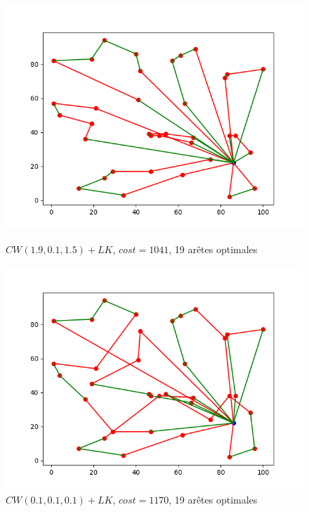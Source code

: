 \documentclass[a4paper,11pt]{article}%
\begin{document}
\begin{figure}
    \begin{minipage}[c]{.46\linewidth}
        \centering
  	\includegraphics[scale=0.4]{edges190115.png}
	\caption{$CW(1.9,0.1,1.5)+LK$, $cost = 1041$, 19 arêtes optimales}
	\label{edges190115}
    \end{minipage}
    \hfill%
    \begin{minipage}[c]{.46\linewidth}
        \centering
	\includegraphics[scale=0.4]{edges101010.png}
	\caption{$CW(0.1,0.1,0.1)+LK$, $cost = 1170$, 19 arêtes optimales}
	\label{edges101010}
    \end{minipage}


\end{figure}
\end{document}
